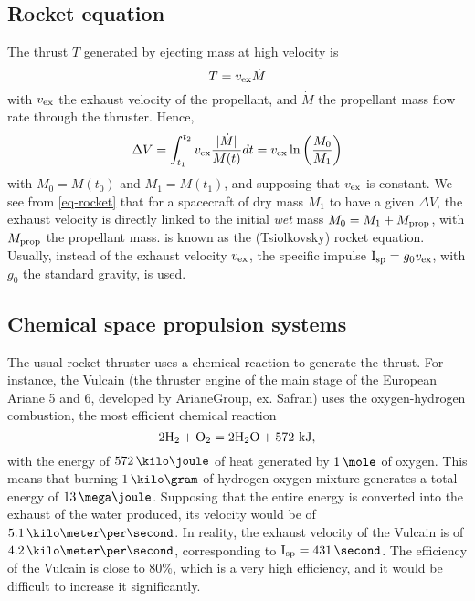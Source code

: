 \subsection{Rocket equation}
The thrust $T$ generated by ejecting mass at high velocity is
\begin{equation} \label{eq-thurst}
  T = v_{\rm ex} \dot{M}
\end{equation}
with $v_{\rm ex}$ the exhaust velocity of the propellant, and $\dot{M}$ the propellant mass flow rate through the thruster.
Hence,
\begin{equation} \label{eq-rocket}
  \Delta V = \int_{t_1}^{t_2} v_{\rm ex} \frac{ \lvert\dot{M}\rvert}{M(t)} dt = v_{\rm ex} \ln \left( \frac{M_0}{M_1} \right)
\end{equation}
with $M_0 = M(t_0)$ and $M_1=M(t_1)$, and supposing that $v_{\rm ex}$ is constant.
We see from \cref{eq-rocket} that for a spacecraft of dry mass $M_1$ to have a given $\Delta V$, the exhaust velocity is directly linked to the initial \emph{wet} mass $M_0 = M_1 + M_{\rm prop}$, with $M_{\rm prop}$ the propellant mass.
 is known as the (Tsiolkovsky) rocket equation.
Usually, instead of the exhaust velocity $v_{\rm ex}$, the specific impulse ${\rm I_{\rm sp} } = g_0 v_{\rm ex}$, with $g_0$ the standard gravity, is used.

\subsection{Chemical space propulsion systems}
The usual rocket thruster uses a chemical reaction to generate the thrust.
For instance, the Vulcain (the thruster engine of the main stage of the European Ariane 5 and 6, developed by ArianeGroup, ex. Safran) uses the oxygen-hydrogen combustion, the most efficient chemical reaction \citep{nasa-H2O2}
\begin{equation*}
  2 {\rm H_2} + { \rm O_2} = 2 {\rm H_2 O} + 572 \text{~kJ},
\end{equation*}
with the energy of $572\,\kilo\joule$ of heat generated by $1\,\mole$ of oxygen.
This means that burning $1\,\kilo\gram$ of hydrogen-oxygen mixture generates a total energy of $13\,\mega\joule$. 
Supposing that the entire energy is converted into the exhaust of the water produced, its velocity would be of $5.1 \,\kms$.
In reality, the exhaust velocity of the Vulcain is of $4.2 \,\kms$, corresponding to $\Isp=431 \,\second$.
The efficiency of the Vulcain is close to 80\%, which is a very high efficiency, and it would be difficult to increase it significantly. 

